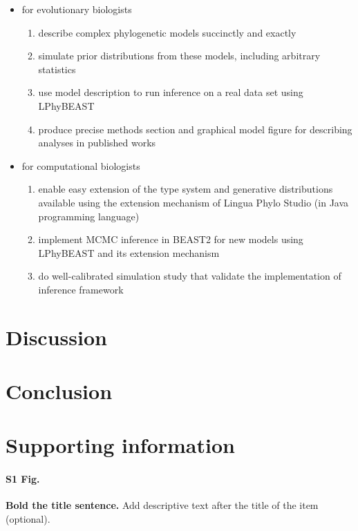 \documentclass[10pt,letterpaper,table]{article}
\begin{document}
{\begin{itemize}
\item for evolutionary biologists
\begin{enumerate}
\item describe complex phylogenetic models succinctly and exactly
\item simulate prior distributions from these models, including arbitrary statistics
\item use model description to run inference on a real data set using LPhyBEAST
\item produce precise methods section and graphical model figure for describing analyses in published works
\end{enumerate}
\item for computational biologists
\begin{enumerate}
\item enable easy extension of the type system and generative distributions available using the extension mechanism of Lingua Phylo Studio (in Java programming language)
\item implement MCMC inference in BEAST2 for new models using LPhyBEAST and its extension mechanism
\item do well-calibrated simulation study that validate the implementation of inference framework
\end{enumerate}
\end{itemize}


\section*{Discussion}

\section*{Conclusion}

\section*{Supporting information}

\paragraph*{S1 Fig.}
\label{S1_Fig}
{\bf Bold the title sentence.} Add descriptive text after the title of the item (optional).

}
\end{document}
